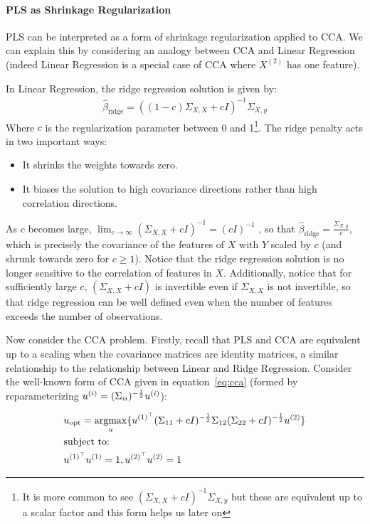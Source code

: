 \paragraph{PLS as Shrinkage Regularization}

PLS can be interpreted as a form of shrinkage regularization applied to CCA. We can explain this by considering an analogy between CCA and Linear Regression (indeed Linear Regression is a special case of CCA where \(X^{(2)}\) has one feature).

In Linear Regression, the ridge regression solution is given by:
\begin{align}
    \hat{\beta}_{\text{ridge}} = ((1-c)\Sigma_{X,X} + c I)^{-1} \Sigma_{X,y}
\end{align}
Where \(c\) is the regularization parameter between 0 and 1\footnote{It is more common to see $(\Sigma_{X,X} + c I)^{-1} \Sigma_{X,y}$ but these are equivalent up to a scalar factor and this form helps us later on}.
The ridge penalty acts in two important ways:
\begin{itemize}
    \item It shrinks the \gls{weights} towards zero.
    \item It biases the solution to high covariance directions rather than high correlation directions.
\end{itemize}

As $c$ becomes large, $\lim_{c \to \infty} (\Sigma_{X,X} + c I)^{-1} = (c I)^{-1}$
, so that $\hat{\beta}_{\text{ridge}}=\frac{\Sigma_{X,y}}{c}$, which is precisely the covariance of the features of $X$ with $Y$ scaled by $c$ (and shrunk towards zero for $c \geq 1$).
Notice that the ridge regression solution is no longer sensitive to the correlation of features in $X$.
Additionally, notice that for sufficiently large $c$, $(\Sigma_{X,X} + c I)$ is invertible even if $\Sigma_{X,X}$ is not invertible, so that ridge regression can be well defined even when the number of features exceeds the number of observations.

Now consider the CCA problem.
Firstly, recall that PLS and CCA are equivalent up to a scaling when the covariance matrices are identity matrices, a similar relationship to the relationship between Linear and Ridge Regression.
Consider the well-known form of CCA given in equation~\ref{eq:cca}\citep{mihalik2022canonical} (formed by reparameterizing \(u^{(i)}=(\Sigma_{ii})^{-\frac{1}{2}}u^{(i)}\)):

\begin{align}\label{eq:cca}
     & u_{\text{opt}}=\underset{u}{\mathrm{argmax}}\{ u^{(1)^{\top}}(\Sigma_{11}+ c I)^{-\frac{1}{2}}\Sigma_{12}(\Sigma_{22}+c I)^{-\frac{1}{2}}u^{(2)} \} \\
     & \text{subject to:} \notag \\
     & u^{(1)^{\top}}u^{(1)}=1, u^{(2)^{\top}}u^{(2)}=1 \notag
\end{align}

